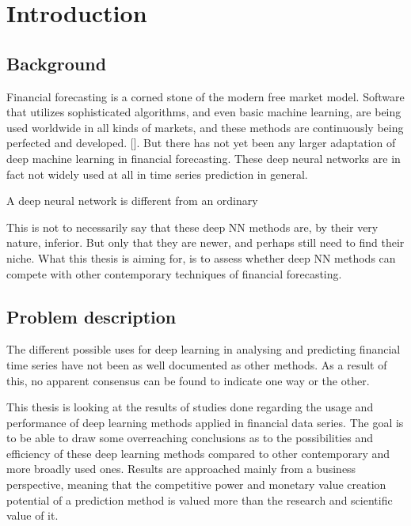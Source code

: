 \section{Introduction}

\subsection{Background}



Financial forecasting is a corned stone of the modern free market model. Software that utilizes sophisticated algorithms, and even basic machine learning, are being used worldwide in all kinds of markets, and these methods are continuously being perfected and developed. []. But there has not yet been any larger adaptation of deep machine learning in financial forecasting. These deep neural networks are in fact not widely used at all in time series prediction in general.

A deep neural network is different from an ordinary 

This is not to necessarily say that these deep NN methods are, by their very nature, inferior. But only that they are newer, and perhaps still need to find their niche.
What this thesis is aiming for, is to assess whether deep NN methods can compete with other contemporary techniques of financial forecasting.


\subsection{Problem description}


The different possible uses for deep learning in analysing and predicting financial time series have not been as well documented as other methods. As a result of this, no apparent consensus can be found to indicate one way or the other.

This thesis is looking at the results of studies done regarding the usage and performance of deep learning methods applied in financial data series. The goal is to be able to draw some overreaching conclusions as to the possibilities and efficiency of these deep learning methods compared to other contemporary and more broadly used ones. Results are approached mainly from a business perspective, meaning that the competitive power and monetary value creation potential of a prediction method is valued more than the research and scientific value of it.


